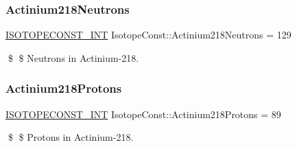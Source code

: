 \subsubsection{\texorpdfstring{Actinium218\+Neutrons}{Actinium218Neutrons}}
{\footnotesize\ttfamily \mbox{\hyperlink{group___isotope_const-_macros_ga5f18360b3e99483a35c32d789e62621c}{I\+S\+O\+T\+O\+P\+E\+C\+O\+N\+S\+T\+\_\+\+I\+NT}} Isotope\+Const\+::\+Actinium218\+Neutrons = 129}

\$ \$ Neutrons in Actinium-\/218. \mbox{\label{group___isotope_const-_actinium-_ac218_gad48ef6a7b206af6766dbf7d88c45e786}} 
\subsubsection{\texorpdfstring{Actinium218\+Protons}{Actinium218Protons}}
{\footnotesize\ttfamily \mbox{\hyperlink{group___isotope_const-_macros_ga5f18360b3e99483a35c32d789e62621c}{I\+S\+O\+T\+O\+P\+E\+C\+O\+N\+S\+T\+\_\+\+I\+NT}} Isotope\+Const\+::\+Actinium218\+Protons = 89}

\$ \$ Protons in Actinium-\/218. 